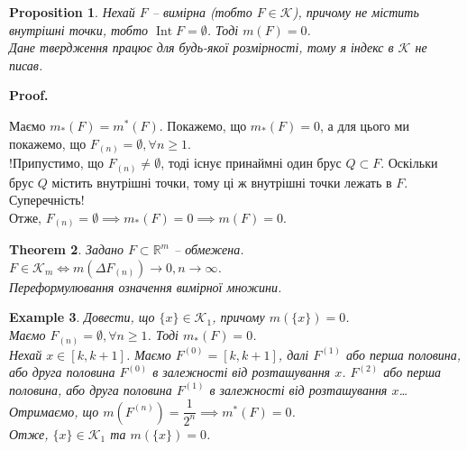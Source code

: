 \documentclass[a4paper, 10pt]{article}
\makeatletter
\def\qed{$\blacksquare$}
\theoremstyle{theoremdd}
\newtheorem{theorem}{Theorem}[subsection]
\theoremstyle{theoremdd}
\theoremstyle{theoremdd}
\theoremstyle{theoremdd}
\newtheorem{example}[theorem]{Example}
\theoremstyle{theoremdd}
\newtheorem{proposition}[theorem]{Proposition}
\theoremstyle{theoremdd}
\theoremstyle{theoremdd}
\theoremstyle{theoremdd}
\renewenvironment{proof}[1][Proof.\\]{\par
\pushQED{\hfill \qed}%
\normalfont \topsep6\p@\@plus6\p@\relax
\trivlist
\item\relax
{\bfseries
#1\@addpunct{.}}\hspace\labelsep\ignorespaces
}{%
\popQED\endtrivlist\@endpefalse
}
\DeclareMathOperator{\Int}{Int}
\makeatother
\begin{document}
\begin{proposition}
Нехай $F$ -- вимірна (тобто $F \in \mathcal{K}$), причому не містить внутрішні точки, тобто $\Int F = \emptyset$. Тоді $m(F) = 0$.\\
\textit{Дане твердження працює для будь-якої розмірності, тому я індекс в $\mathcal{K}$ не писав.}
\end{proposition}

\begin{proof}
Маємо $m_*(F) = m^*(F)$. Покажемо, що $m_*(F) = 0$, а для цього ми покажемо, що $F_{(n)} = \emptyset, \forall n \geq 1$.\\
!Припустимо, що $F_{(n)} \neq \emptyset$, тоді існує принаймні один брус $Q \subset F$. Оскільки брус $Q$ містить внутрішні точки, тому ці ж внутрішні точки лежать в $F$. Суперечність!\\
Отже, $F_{(n)} = \emptyset \implies m_*(F) = 0 \implies m(F) = 0$.
\end{proof}

\begin{theorem}
Задано $F \subset \mathbb{R}^m$ -- обмежена.\\
$F \in \mathcal{K}_m \iff m(\Delta F_{(n)}) \to 0, n \to \infty$.\\
\textit{Переформулювання означення вимірної множини.}
\end{theorem}

\begin{example}
Довести, що $\{x\} \in \mathcal{K}_1$, причому $m(\{x\}) = 0$.\\
Маємо $F_{(n)} = \emptyset, \forall n \geq 1$. Тоді $m_*(F) = 0$.\\
Нехай $x \in [k,k+1]$. Маємо $F^{(0)} = [k,k+1]$, далі $F^{(1)}$ або перша половина, або друга половина $F^{(0)}$ в залежності від розташування $x$. $F^{(2)}$ або перша половина, або друга половина $F^{(1)}$ в залежності від розташування $x$\dots \\
Отримаємо, що $m(F^{(n)}) = \dfrac{1}{2^n} \implies m^*(F) = 0$.\\
Отже, $\{x\} \in \mathcal{K}_1$ та $m(\{x\}) = 0$.
\end{example}
\end{document}

